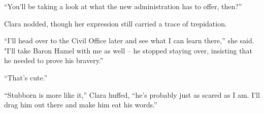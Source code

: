  

“You’ll be taking a look at what the new administration has to offer, then?”

 

Clara nodded, though her expression still carried a trace of trepidation.

 

“I’ll head over to the Civil Office later and see what I can learn there,” she said. "I’ll take Baron Hamel with me as well – he stopped staying over, insisting that he needed to prove his bravery.”

 

“That’s cute.”

 

“Stubborn is more like it,” Clara huffed, “he’s probably just as scared as I am. I’ll drag him out there and make him eat his words.”
